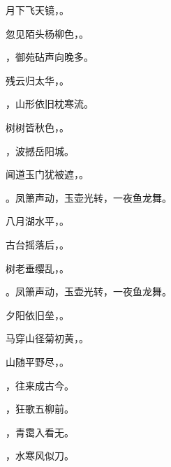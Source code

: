 \documentclass[12pt, a4paper, addpoints]{exam}
\begin{document}
\begin{questions}
\question[1] 月下飞天镜，\uline{\qquad\qquad\qquad}。

\question[1] 忽见陌头杨柳色，\uline{\qquad\qquad\qquad}。

\question[1] \uline{\qquad\qquad\qquad}，御苑砧声向晚多。

\question[1] 残云归太华，\uline{\qquad\qquad\qquad}。

\question[1] \uline{\qquad\qquad\qquad}，山形依旧枕寒流。

\question[1] 树树皆秋色，\uline{\qquad\qquad\qquad}。

\question[1] \uline{\qquad\qquad\qquad}，波撼岳阳城。

\question[1] 闻道玉门犹被遮，\uline{\qquad\qquad\qquad}。

\question[1] \uline{\qquad\qquad\qquad}。凤箫声动，玉壶光转，一夜鱼龙舞。

\question[1] 八月湖水平，\uline{\qquad\qquad\qquad}。

\question[1] 古台摇落后，\uline{\qquad\qquad\qquad}。

\question[1] 树老垂缨乱，\uline{\qquad\qquad\qquad}。

\question[1] \uline{\qquad\qquad\qquad}。凤箫声动，玉壶光转，一夜鱼龙舞。

\question[1] 夕阳依旧垒，\uline{\qquad\qquad\qquad}。

\question[1] 马穿山径菊初黄，\uline{\qquad\qquad\qquad}。

\question[1] 山随平野尽，\uline{\qquad\qquad\qquad}。

\question[1] \uline{\qquad\qquad\qquad}，往来成古今。

\question[1] \uline{\qquad\qquad\qquad}，狂歌五柳前。

\question[1] \uline{\qquad\qquad\qquad}，青霭入看无。

\question[1] \uline{\qquad\qquad\qquad}，水寒风似刀。

\end{questions}

\hspace{5cm}
\end{document}
